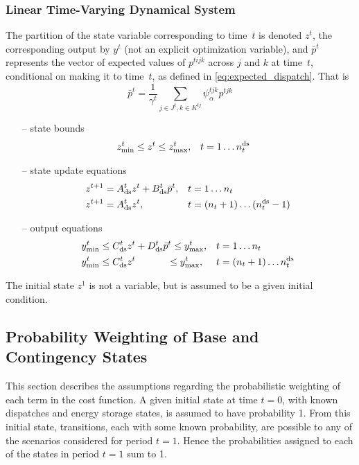 \documentclass[12pt]{article}
\numberwithin{equation}{section}
\numberwithin{table}{section}
\numberwithin{figure}{section}
\begin{document}
\subsubsection*{Linear Time-Varying Dynamical System}

The partition of the state variable corresponding to time~$t$ is denoted $z^t$, the corresponding output by $y^t$ (not an explicit optimization variable), and $\bar{p}^t$ represents the vector of expected values of $p^{tijk}$ across $j$ and $k$ at time~$t$, conditional on making it to time~$t$, as defined in \eqref{eq:expected_dispatch}. That is
\begin{equation}
 \bar{p}^t = \frac{1}{\gamma^t} \sum_{j \in J^t, k \in K^{tj}} \!\!\! \psi_\alpha^{tjk} p^{tjk}
\end{equation}
\begin{itemize}
\item[--] state bounds
\begin{align}
 z_{\rm min}^t & \leq z^t \leq  z_{\rm max}^t, & t &= 1 \dots n_t^{\rm ds} \label{eq:dynbounds}
\end{align}
\item[--] state update equations
\begin{align}
 z^{t+1} & = A_{\rm ds}^t z^t + B_{\rm ds}^t \bar{p}^t, & t &= 1 \dots n_t \label{eq:dynstate1} \\
 z^{t+1} & = A_{\rm ds}^t z^t, & t &= (n_t + 1) \dots (n_t^{\rm ds}-1) \label{eq:dynstate2}
\end{align}
\item[--] output equations
\begin{align}
 y_{\rm min}^t & \le C_{\rm ds}^t z^t + D_{\rm ds}^t \bar{p}^t \le y_{\rm max}^t, & t &= 1 \dots n_t \label{eq:dynout1} \\
 y_{\rm min}^t & \le C_{\rm ds}^t z^t \qquad\quad\; \le y_{\rm max}^t, & t &= (n_t + 1) \dots n_t^{\rm ds} \label{eq:dynout2}
\end{align}
\end{itemize}
The initial state $z^1$ is not a variable, but is assumed to be a given initial condition.

\subsection{Probability Weighting of Base and Contingency States}

This section describes the assumptions regarding the probabilistic weighting of each term in the cost function. A given initial state at time $t=0$, with known dispatches and energy storage states, is assumed to have probability 1. From this initial state, transitions, each with some known probability, are possible to any of the scenarios considered for period $t=1$. Hence the probabilities assigned to each of the states in period $t=1$ sum to 1.
\end{document}
